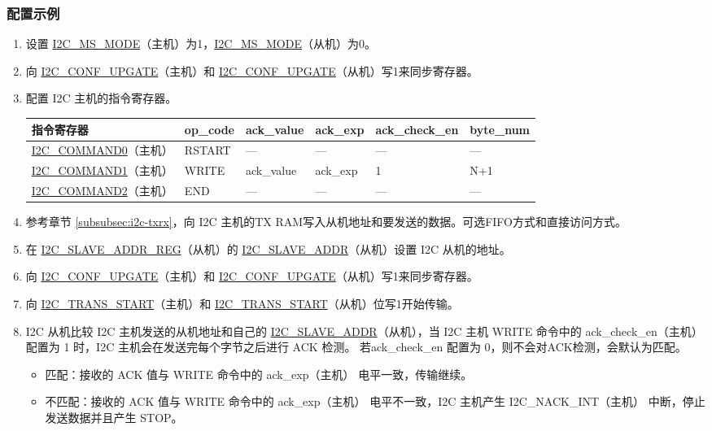 \documentclass[main\_\_CN.tex]{subfiles}
\begin{document}
\subsubsection{配置示例}
\begin{enumerate}
\item 设置 \hyperref[fielddesc:I2CMSMODE]{I2C\_MS\_MODE}（主机）为1，\hyperref[fielddesc:I2CMSMODE]{I2C\_MS\_MODE}（从机）为0。
\item 向 \hyperref[fielddesc:I2CCONFUPGATE]{I2C\_CONF\_UPGATE}（主机）和 \hyperref[fielddesc:I2CCONFUPGATE]{I2C\_CONF\_UPGATE}（从机）写1来同步寄存器。
\item 配置 I2C 主机的指令寄存器。
\begin{longtable}{ | p{4cm} | p{2cm} | p{2cm} | p{2cm} |p{2cm} | p{2cm} |}
\hline\rowcolor{lightgray}
指令寄存器& op\_code & ack\_value&ack\_exp&ack\_check\_en&byte\_num  \\ \hline
\hyperref[fielddesc:I2CCOMMAND0]{I2C\_COMMAND0}（主机）& RSTART& ---&---&---&---  \\ \hline
\hyperref[fielddesc:I2CCOMMAND1]{I2C\_COMMAND1}（主机）& WRITE& ack\_value&ack\_exp&1&N+1  \\ \hline
\hyperref[fielddesc:I2CCOMMAND2]{I2C\_COMMAND2}（主机）& END& ---&---&---&---  \\ \hline
\end{longtable}
\item 参考章节 \ref{subsubsec:i2c-txrx}，向 I2C 主机的TX RAM写入从机地址和要发送的数据。可选FIFO方式和直接访问方式。
\item 在 \hyperref[regdesc:I2CSLAVEADDRREG]{I2C\_SLAVE\_ADDR\_REG}（从机）的 \hyperref[fielddesc:I2CSLAVEADDR]{I2C\_SLAVE\_ADDR}（从机）设置 I2C 从机的地址。
\item 向 \hyperref[fielddesc:I2CCONFUPGATE]{I2C\_CONF\_UPGATE}（主机）和 \hyperref[fielddesc:I2CCONFUPGATE]{I2C\_CONF\_UPGATE}（从机）写1来同步寄存器。
\item 向 \hyperref[fielddesc:I2CTRANSSTART]{I2C\_TRANS\_START}（主机）和 \hyperref[fielddesc:I2CTRANSSTART]{I2C\_TRANS\_START}（从机）位写1开始传输。
\item I2C 从机比较 I2C 主机发送的从机地址和自己的 \hyperref[fielddesc:I2CSLAVEADDR]{I2C\_SLAVE\_ADDR}（从机），当 I2C 主机 WRITE 命令中的 ack\_check\_en（主机） 配置为 1 时，I2C 主机会在发送完每个字节之后进行 ACK 检测。 若ack\_check\_en 配置为 0，则不会对ACK检测，会默认为匹配。
\begin{itemize}
\item 匹配：接收的 ACK 值与 WRITE 命令中的 ack\_exp（主机） 电平一致，传输继续。
\item 不匹配：接收的 ACK 值与 WRITE 命令中的 ack\_exp（主机） 电平不一致，I2C 主机产生 I2C\_NACK\_INT（主机） 中断，停止发送数据并且产生 STOP。
\end{itemize}


\end{enumerate}
\end{document}
